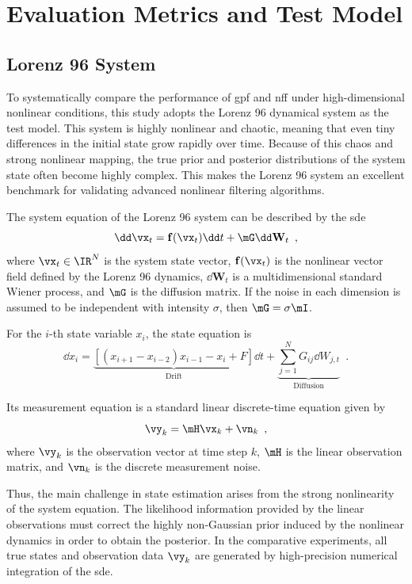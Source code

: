 \section{Evaluation Metrics and Test Model}
\label{sec:evaluation_metrics}

\subsection{Lorenz 96 System}
\label{subsec:lorenz96}

To systematically compare the performance of \ac{gpf} and \ac{nff} under high-dimensional nonlinear conditions, this study adopts the Lorenz 96 dynamical system as the test model. This system is highly nonlinear and chaotic, meaning that even tiny differences in the initial state grow rapidly over time. Because of this chaos and strong nonlinear mapping, the true prior and posterior distributions of the system state often become highly complex. This makes the Lorenz 96 system an excellent benchmark for validating advanced nonlinear filtering algorithms.

The system equation of the Lorenz 96 system can be described by the \ac{sde}
\begin{equation}
	\dd\vx_t = \mathbf{f}(\vx_t) \dd t + \mG \dd\mathbf{W}_t \enspace,
\end{equation}
where $\vx_t \in \IR^N$ is the system state vector, $\mathbf{f}(\vx_t)$ is the nonlinear vector field defined by the Lorenz 96 dynamics, $\dd\mathbf{W}_t$ is a multidimensional standard Wiener process, and $\mG$ is the diffusion matrix. If the noise in each dimension is assumed to be independent with intensity $\sigma$, then $\mG = \sigma \mI$.

For the $i$-th state variable $x_i$, the state equation is
\begin{equation}
	\dd x_i = \underbrace{\left[ (x_{i+1} - x_{i-2})x_{i-1} - x_i + F \right]}_{\text{Drift}} \dd t + \underbrace{\sum_{j=1}^{N} G_{ij} \dd W_{j,t}}_{\text{Diffusion}} \enspace.
\end{equation}

Its measurement equation is a standard linear discrete-time equation given by
\begin{equation}
	\vy_k = \mH \vx_k + \vn_k \enspace,
\end{equation}
where $\vy_k$ is the observation vector at time step $k$, $\mH$ is the linear observation matrix, and $\vn_k$ is the discrete measurement noise.

Thus, the main challenge in state estimation arises from the strong nonlinearity of the system equation. The likelihood information provided by the linear observations must correct the highly non-Gaussian prior induced by the nonlinear dynamics in order to obtain the posterior. In the comparative experiments, all true states and observation data $\vy_k$ are generated by high-precision numerical integration of the \ac{sde}.

